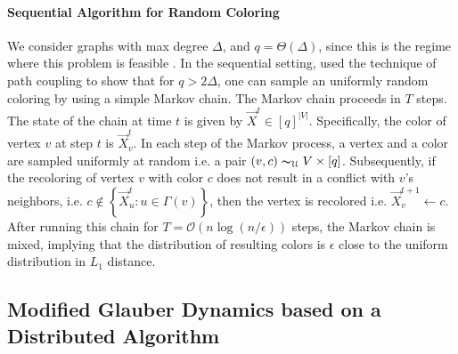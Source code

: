 \paragraph*{Sequential Algorithm for Random Coloring}
\label{par:sequential_algorithm_for_random_coloring}
We consider graphs with max degree $\Delta$, and $q = \Theta(\Delta)$, since this is the regime where this problem is feasible \cite{glauber_survey}.
In the sequential setting, \cite{glauber_survey} used the technique of path coupling to show that for $q > 2\Delta$,
one can sample an uniformly random coloring by using a simple Markov chain.
The Markov chain proceeds in $T$ steps. The state of the chain at time $t$ is given by $\vec X^t\in [q]^{|V|}$.
Specifically, the color of vertex $v$ at step $t$ is $\vec X^t_v$.
In each step of the Markov process, a vertex and a color are sampled uniformly at random i.e. a pair $(v, c)\thicksim_{\mathcal U} V\times [q]$.
Subsequently, if the recoloring of vertex $v$ with color $c$ does not result in a conflict with $v$'s neighbors,
i.e. $c\not\in \left\{ \vec X^t_u : u\in \Gamma(v)\right\}$, then the vertex is recolored i.e. $\vec X_v^{t+1}\leftarrow c$.
After running this chain for $T = \mathcal{O}(n\log (n/\epsilon))$ steps, the Markov chain is mixed,
implying that the distribution of resulting colors is $\epsilon$ close to the uniform distribution in $L_1$ distance.



\subsection{Modified Glauber Dynamics based on a Distributed Algorithm}%
\label{sec:modified_glauber_dynamics}

